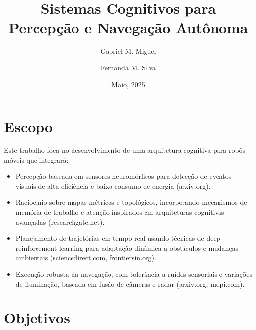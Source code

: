 \documentclass[a4paper,12pt]{article}
\title{Sistemas Cognitivos para Percepção e Navegação Autônoma}
\author{Gabriel M. Miguel \and Fernanda M. Silva}
\date{Maio, 2025}
\begin{document}
	
	\maketitle
	
		
	
	

	\newpage
	\section{Escopo}
	Este trabalho foca no desenvolvimento de uma arquitetura cognitiva para robôs móveis que integrará:
	\begin{itemize}
		\item Percepção baseada em sensores neuromórficos para detecção de eventos visuais de alta eficiência e baixo consumo de energia (arxiv.org).
		\item Raciocínio sobre mapas métricos e topológicos, incorporando mecanismos de memória de trabalho e atenção inspirados em arquiteturas cognitivas avançadas (researchgate.net).
		\item Planejamento de trajetórias em tempo real usando técnicas de deep reinforcement learning para adaptação dinâmica a obstáculos e mudanças ambientais (sciencedirect.com, frontiersin.org).
		\item Execução robusta da navegação, com tolerância a ruídos sensoriais e variações de iluminação, baseada em fusão de câmeras e radar (arxiv.org, mdpi.com).
	\end{itemize}
	
	\section{Objetivos}
\end{document}
